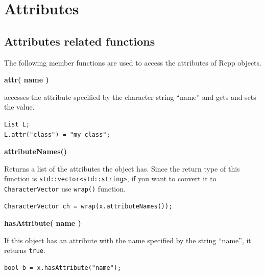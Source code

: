 \documentclass[
]{book}
\begin{document}
\hypertarget{attributes}{%
\chapter{Attributes}\label{attributes}}

\hypertarget{attributes-related-functions}{%
\section{Attributes related functions}\label{attributes-related-functions}}

The following member functions are used to access the attributes of Rcpp objects.

\textbf{attr( name )}

accesses the attribute specified by the character string ``name'' and gets and sets the value.

\begin{verbatim}
List L;
L.attr("class") = "my_class";
\end{verbatim}

\textbf{attributeNames()}

Returns a list of the attributes the object has. Since the return type of this function is \texttt{std::vector\textless{}std::string\textgreater{}}, if you want to convert it to \texttt{CharacterVector} use \texttt{wrap()} function.

\begin{verbatim}
CharacterVector ch = wrap(x.attributeNames());
\end{verbatim}

\textbf{hasAttribute( name )}

If this object has an attribute with the name specified by the string ``name'', it returns \texttt{true}.

\begin{verbatim}
bool b = x.hasAttribute("name");
\end{verbatim}
\end{document}
